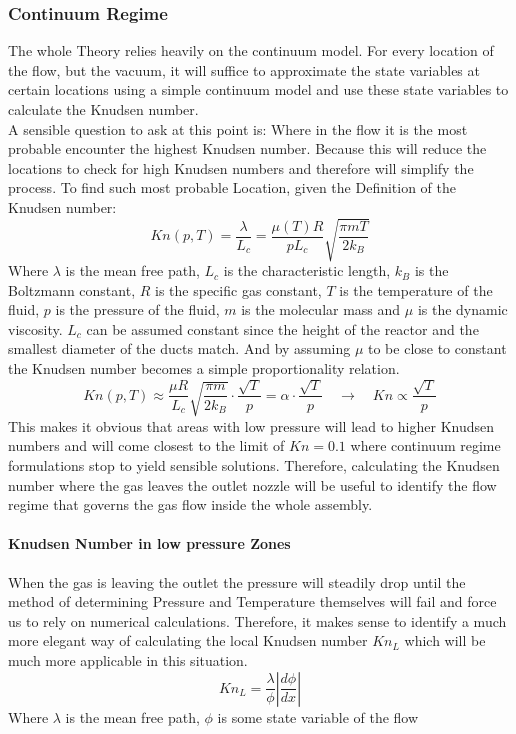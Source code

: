 
\subsubsection{Continuum Regime}
	The whole Theory relies heavily on the continuum model.
	For every location of the flow, but the vacuum, it will suffice to approximate the state variables at certain locations using a simple continuum model and use these state variables to calculate the Knudsen number.\\
	A sensible question to ask at this point is: Where in the flow it is the most probable encounter the highest Knudsen number.
	Because this will reduce the locations to check for high Knudsen numbers and therefore will simplify the process.
	To find such most probable Location, given the Definition of the Knudsen number:
	$$
		Kn(p,T) = \frac{\lambda}{L_c} = \frac{\mu(T)R}{pL_c}\sqrt{\frac{\pi m T}{2k_B}}
	$$
	Where $\lambda$ is the mean free path, $L_c$ is the characteristic length, $k_B$ is the Boltzmann constant, $R$ is the specific gas constant, $T$ is the temperature of the fluid, $p$ is the pressure of the fluid, $m$ is the molecular mass and $\mu$ is the dynamic viscosity.
	$L_c$ can be assumed constant since the height of the reactor and the smallest diameter of the ducts match.
	And by assuming $\mu$ to be close to constant the Knudsen number becomes a simple proportionality relation.
	$$
		Kn(p,T)\approx\frac{\mu R}{L_c}\sqrt{\frac{\pi m}{2k_B}}\cdot\frac{\sqrt{T}}{p}=\alpha\cdot\frac{\sqrt{T}}{p}\quad\rightarrow\quad Kn\propto \frac{\sqrt{T}}{p}
	$$
	This makes it obvious that areas with low pressure will lead to higher Knudsen numbers and will come closest to the limit of $Kn=0.1$ where continuum regime formulations stop to yield sensible solutions.
	Therefore, calculating the Knudsen number where the gas leaves the outlet nozzle will be useful to identify the flow regime that governs the gas flow inside the whole assembly.

\paragraph{Knudsen Number in low pressure Zones}

	When the gas is leaving the outlet the pressure will steadily drop until the method of determining Pressure and Temperature themselves will fail and force us to rely on numerical calculations.
	Therefore, it makes sense to identify a much more elegant way of calculating the local Knudsen number $Kn_L$ which will be much more applicable in this situation.
	$$
		K n_L = \frac{\lambda}{\phi} \left| \frac{d\phi}{dx} \right|
	$$
	Where $\lambda$ is the mean free path, $\phi$ is some state variable of the flow


